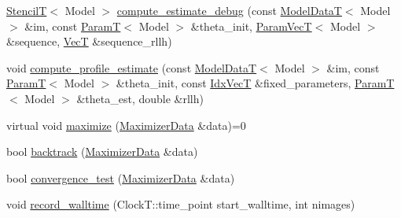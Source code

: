 \begin{DoxyCompactItemize}
\hyperlink{namespacemappel_a3a06598240007876f8c4bf834ad86197}{StencilT}$<$ Model $>$ \hyperlink{classmappel_1_1IterativeMaximizer_aa45c11a399f29985fc9bd3365e809335}{compute\+\_\+estimate\+\_\+debug} (const \hyperlink{namespacemappel_a97f050df953605381ae9c901c3b125f1}{Model\+DataT}$<$ Model $>$ \&im, const \hyperlink{namespacemappel_a667925cb0d6c0e49f2f035cc5a9a6857}{ParamT}$<$ Model $>$ \&theta\+\_\+init, \hyperlink{namespacemappel_a0f86d3153e4e27b095012f140eea58de}{Param\+VecT}$<$ Model $>$ \&sequence, \hyperlink{namespacemappel_a2225ad69f358daa3f4f99282a35b9a3a}{VecT} \&sequence\+\_\+rllh)
\item 
void \hyperlink{classmappel_1_1IterativeMaximizer_a1999fd1fa63c803b3aad87695fc82843}{compute\+\_\+profile\+\_\+estimate} (const \hyperlink{namespacemappel_a97f050df953605381ae9c901c3b125f1}{Model\+DataT}$<$ Model $>$ \&im, const \hyperlink{namespacemappel_a667925cb0d6c0e49f2f035cc5a9a6857}{ParamT}$<$ Model $>$ \&theta\+\_\+init, const \hyperlink{namespacemappel_ac63743dcd42180127307cd0e4ecdd784}{Idx\+VecT} \&fixed\+\_\+parameters, \hyperlink{namespacemappel_a667925cb0d6c0e49f2f035cc5a9a6857}{ParamT}$<$ Model $>$ \&theta\+\_\+est, double \&rllh)
\item 
virtual void \hyperlink{classmappel_1_1IterativeMaximizer_a4d05ed89de53e6e73f2f13bef30862ec}{maximize} (\hyperlink{classmappel_1_1NewtonMaximizer_af5da826cdff84efbe35e4268916fe810}{Maximizer\+Data} \&data)=0
\item 
bool \hyperlink{classmappel_1_1IterativeMaximizer_ac033d2b23a6a861e6d7adbe35f17624e}{backtrack} (\hyperlink{classmappel_1_1NewtonMaximizer_af5da826cdff84efbe35e4268916fe810}{Maximizer\+Data} \&data)
\item 
bool \hyperlink{classmappel_1_1IterativeMaximizer_aef9b61d66d785a1a06dd2c75c3166435}{convergence\+\_\+test} (\hyperlink{classmappel_1_1NewtonMaximizer_af5da826cdff84efbe35e4268916fe810}{Maximizer\+Data} \&data)
\item 
void \hyperlink{classmappel_1_1Estimator_a50125572d3b87ebcf1ffb27a8d8c643d}{record\+\_\+walltime} (Clock\+T\+::time\+\_\+point start\+\_\+walltime, int nimages)
\end{DoxyCompactItemize}
